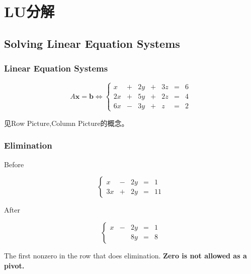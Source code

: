\chapter{LU分解}

\section{Solving Linear Equation Systems}

\subsection{Linear Equation Systems}
\begin{example}
    \begin{equation}
         A\boldsymbol{x} =\boldsymbol{b} \Leftrightarrow { \left\{\begin{matrix}
        x & + & 2y & + & 3z & = & 6\\
        2x & + & 5y & + & 2z & = & 4\\
        6x & - & 3y & + & z & = & 2
        \end{matrix}\right. }
         \end{equation}
\end{example}

见Row Picture,Column Picture的概念。

\subsection{Elimination}

\begin{example}[Elimination]
    Before

        $$ \left\{\begin{matrix}
        x & - & 2y & = & 1\\
        3x & + & 2y & = & 11
        \end{matrix}\right. $$
        
        
   
    After
    
    $$ \left\{\begin{matrix}
        x & - & 2y & = & 1\\
         &  & 8y & = & 8
        \end{matrix}\right. $$
    

\end{example}

\begin{definition}[Pivot]
    The first nonzero in the row that does elimination. \textbf{Zero is not allowed as a pivot.}
\end{definition}

